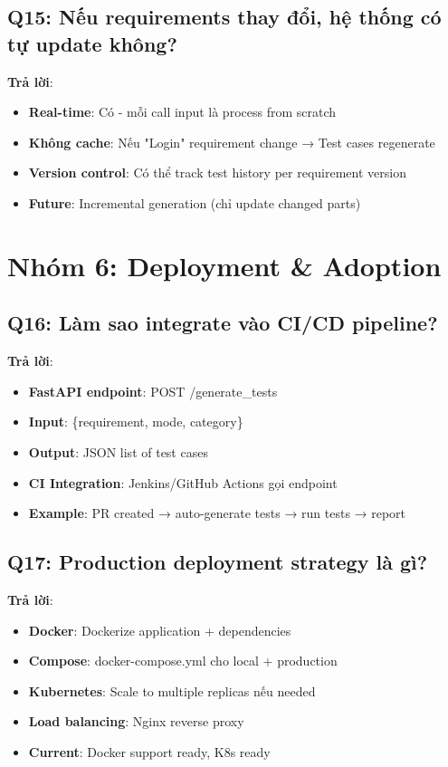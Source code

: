 \documentclass[12pt,a4paper]{report}
\begin{document}
\subsection{Q15: Nếu requirements thay đổi, hệ thống có tự update không?}

\textbf{Trả lời}:
\begin{itemize}
    \item \textbf{Real-time}: Có - mỗi call input là process from scratch
    \item \textbf{Không cache}: Nếu "Login" requirement change → Test cases regenerate
    \item \textbf{Version control}: Có thể track test history per requirement version
    \item \textbf{Future}: Incremental generation (chỉ update changed parts)
\end{itemize}

\section{Nhóm 6: Deployment & Adoption}

\subsection{Q16: Làm sao integrate vào CI/CD pipeline?}

\textbf{Trả lời}:
\begin{itemize}
    \item \textbf{FastAPI endpoint}: POST /generate\_tests
    \item \textbf{Input}: \{requirement, mode, category\}
    \item \textbf{Output}: JSON list of test cases
    \item \textbf{CI Integration}: Jenkins/GitHub Actions gọi endpoint
    \item \textbf{Example}: PR created → auto-generate tests → run tests → report
\end{itemize}

\subsection{Q17: Production deployment strategy là gì?}

\textbf{Trả lời}:
\begin{itemize}
    \item \textbf{Docker}: Dockerize application + dependencies
    \item \textbf{Compose}: docker-compose.yml cho local + production
    \item \textbf{Kubernetes}: Scale to multiple replicas nếu needed
    \item \textbf{Load balancing}: Nginx reverse proxy
    \item \textbf{Current}: Docker support ready, K8s ready
\end{itemize}
\end{document}

